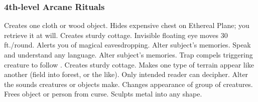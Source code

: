 \subsubsection{4th-level Arcane Rituals}
\begin{rituallist}
     Creates one cloth or wood object.
    \F Hides expensive chest on Ethereal Plane; you retrieve it at will.
     Creates sturdy cottage.
     Invisible floating eye moves 30 ft./round.
     Alerts you of magical eavesdropping.
     Alter subject's memories.
     Speak and understand any language.
     Alter subject's memories.
     Trap compels triggering creature to follow .
     Creates sturdy cottage.
     Makes one type of terrain appear like another (field into forest, or the like).
     Only intended reader can decipher.
     Alter the sounds creatures or objects make.
     Changes appearance of group of creatures.
     Frees object or person from curse.
     Sculpts metal into any shape.
\end{rituallist}

